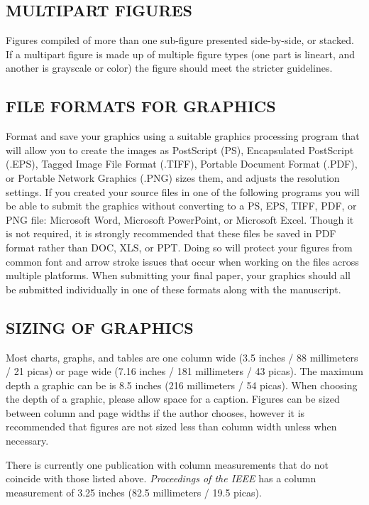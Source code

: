 \documentclass{IEEEoj}
\begin{document}
\subsection{MULTIPART FIGURES}
Figures compiled of more than one sub-figure presented side-by-side, or 
stacked. If a multipart figure is made up of multiple figure types (one part 
is lineart, and another is grayscale or color) the figure should meet the 
stricter guidelines.

\subsection{FILE FORMATS FOR GRAPHICS}\label{formats}
Format and save your graphics using a suitable graphics processing program 
that will allow you to create the images as PostScript (PS), Encapsulated 
PostScript (.EPS), Tagged Image File Format (.TIFF), Portable Document 
Format (.PDF), or Portable Network Graphics (.PNG) sizes them, and adjusts 
the resolution settings. If you created your source files in one of the 
following programs you will be able to submit the graphics without 
converting to a PS, EPS, TIFF, PDF, or PNG file: Microsoft Word, Microsoft 
PowerPoint, or Microsoft Excel. Though it is not required, it is strongly 
recommended that these files be saved in PDF format rather than DOC, XLS, or 
PPT. Doing so will protect your figures from common font and arrow stroke 
issues that occur when working on the files across multiple platforms. When 
submitting your final paper, your graphics should all be submitted 
individually in one of these formats along with the manuscript.

\subsection{SIZING OF GRAPHICS}
Most charts, graphs, and tables are one column wide (3.5 inches / 88 
millimeters / 21 picas) or page wide (7.16 inches / 181 millimeters / 43 
picas). The maximum depth a graphic can be is 8.5 inches (216 millimeters / 
54 picas). When choosing the depth of a graphic, please allow space for a 
caption. Figures can be sized between column and page widths if the author 
chooses, however it is recommended that figures are not sized less than 
column width unless when necessary.

There is currently one publication with column measurements that do not 
coincide with those listed above. \textit{Proceedings of the IEEE} has a column 
measurement of 3.25 inches (82.5 millimeters / 19.5 picas). 
\end{document}
